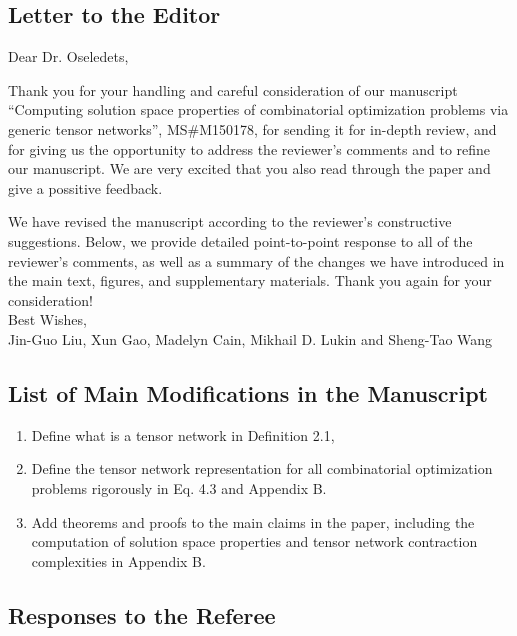 \documentclass[longbibliography]{article}
\date{}
\begin{document}
\subsection{Letter to the Editor}\label{header-n558}

Dear Dr. Oseledets,

Thank you for your handling and careful consideration of our manuscript ``Computing solution space properties of combinatorial optimization problems via generic tensor networks'', MS\#M150178, for sending it for in-depth review, and for giving us the opportunity to address the reviewer's comments and to refine our manuscript. 
We are very excited that you also read through the paper and give a possitive feedback.

We have revised the manuscript according to the reviewer's constructive suggestions.
Below, we provide detailed point-to-point response to all of the reviewer's comments, as well as a summary of the changes we have introduced in the main text, figures, and supplementary materials. Thank you again for your consideration! \\

Best Wishes,\\
Jin-Guo Liu, Xun Gao, Madelyn Cain, Mikhail D. Lukin and Sheng-Tao Wang


\subsection{List of Main Modifications in the Manuscript}\label{header-n30}
\begin{enumerate}
\def\labelenumi{\arabic{enumi}.}
\item Define what is a tensor network in Definition 2.1,
\item Define the tensor network representation for all combinatorial optimization problems rigorously in Eq. 4.3 and Appendix B.
\item Add theorems and proofs to the main claims in the paper, including the computation of solution space properties and tensor network contraction complexities in Appendix B.
\end{enumerate}

\subsection{Responses to the Referee}
\end{document}
